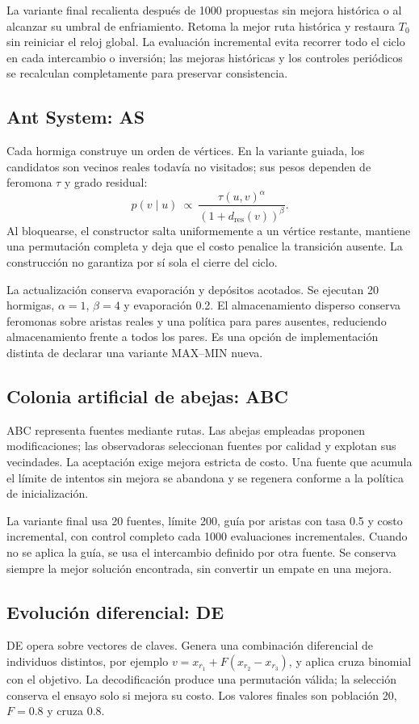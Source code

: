 La variante final recalienta después de 1000 propuestas sin mejora histórica o al alcanzar su umbral de enfriamiento. Retoma la mejor ruta histórica y restaura $T_0$ sin reiniciar el reloj global. La evaluación incremental evita recorrer todo el ciclo en cada intercambio o inversión; las mejoras históricas y los controles periódicos se recalculan completamente para preservar consistencia.

\subsection{Ant System: AS}
Cada hormiga construye un orden de vértices. En la variante guiada, los candidatos son vecinos reales todavía no visitados; sus pesos dependen de feromona $\tau$ y grado residual:
\[
 p(v\mid u)\ \propto\ \frac{\tau(u,v)^{\alpha}}{(1+d_{\mathrm{res}}(v))^{\beta}}.
\]
Al bloquearse, el constructor salta uniformemente a un vértice restante, mantiene una permutación completa y deja que el costo penalice la transición ausente. La construcción no garantiza por sí sola el cierre del ciclo.

La actualización conserva evaporación y depósitos acotados. Se ejecutan 20 hormigas, $\alpha=1$, $\beta=4$ y evaporación 0.2. El almacenamiento disperso conserva feromonas sobre aristas reales y una política para pares ausentes, reduciendo almacenamiento frente a todos los pares. Es una opción de implementación distinta de declarar una variante MAX--MIN nueva.

\subsection{Colonia artificial de abejas: ABC}
ABC representa fuentes mediante rutas. Las abejas empleadas proponen modificaciones; las observadoras seleccionan fuentes por calidad y explotan sus vecindades. La aceptación exige mejora estricta de costo. Una fuente que acumula el límite de intentos sin mejora se abandona y se regenera conforme a la política de inicialización.

La variante final usa 20 fuentes, límite 200, guía por aristas con tasa 0.5 y costo incremental, con control completo cada 1000 evaluaciones incrementales. Cuando no se aplica la guía, se usa el intercambio definido por otra fuente. Se conserva siempre la mejor solución encontrada, sin convertir un empate en una mejora.

\subsection{Evolución diferencial: DE}
DE opera sobre vectores de claves. Genera una combinación diferencial de individuos distintos, por ejemplo $v=x_{r_1}+F(x_{r_2}-x_{r_3})$, y aplica cruza binomial con el objetivo. La decodificación produce una permutación válida; la selección conserva el ensayo solo si mejora su costo. Los valores finales son población 20, $F=0.8$ y cruza 0.8.

